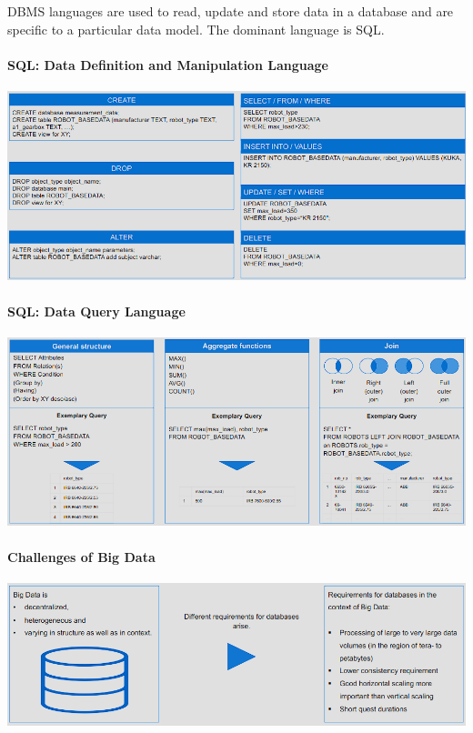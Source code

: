 \documentclass[12pt, a4paper, oneside, justified]{article}
\begin{document}
DBMS languages are used to read, update and store data in a database and are specific to a particular data model. The dominant language is SQL.

\paragraph*{SQL: Data Definition and Manipulation Language}

\begin{center}
\includegraphics[width=1\textwidth]{../img/3-11.png}
\end{center}

\paragraph*{SQL: Data Query Language}

\begin{center}
\includegraphics[width=1\textwidth]{../img/3-12.png}
\end{center}

\paragraph*{Challenges of Big Data}

\begin{center}
\includegraphics[width=1\textwidth]{../img/3-13.png}
\end{center}
\end{document}
